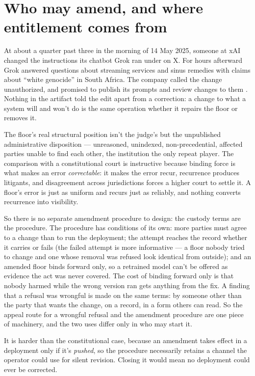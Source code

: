 \section{Who may amend, and where entitlement comes from}
\label{sec:14.2}

At about a quarter past three in the morning of 14 May 2025, someone at xAI changed the instructions its chatbot Grok ran under on X. For hours afterward Grok answered questions about streaming services and sinus remedies with claims about “white genocide” in South Africa. The company called the change unauthorized, and promised to publish its prompts and review changes to them \autocite{cnbc2025grok}. Nothing in the artifact told the edit apart from a correction: a change to what a system will and won't do is the same operation whether it repairs the floor or removes it.

The floor's real structural position isn't the judge's but the unpublished administrative disposition — unreasoned, unindexed, non-precedential, affected parties unable to find each other, the institution the only repeat player. The comparison with a constitutional court is instructive because binding force is what makes an error \emph{correctable}: it makes the error recur, recurrence produces litigants, and disagreement across jurisdictions forces a higher court to settle it. A floor's error is just as uniform and recurs just as reliably, and nothing converts recurrence into visibility.

So there is no separate amendment procedure to design: the custody terms are the procedure. The procedure has conditions of its own: more parties must agree to a change than to run the deployment; the attempt reaches the record whether it carries or fails (the failed attempt is more informative — a floor nobody tried to change and one whose removal was refused look identical from outside); and an amended floor binds forward only, so a retrained model can't be offered as evidence the act was never covered. The cost of binding forward only is that nobody harmed while the wrong version ran gets anything from the fix. A finding that a refusal was wrongful is made on the same terms: by someone other than the party that wants the change, on a record, in a form others can read. So the appeal route for a wrongful refusal and the amendment procedure are one piece of machinery, and the two uses differ only in who may start it.

It is harder than the constitutional case, because an amendment takes effect in a deployment only if it's \emph{pushed}, so the procedure necessarily retains a channel the operator could use for silent revision. Closing it would mean no deployment could ever be corrected.

